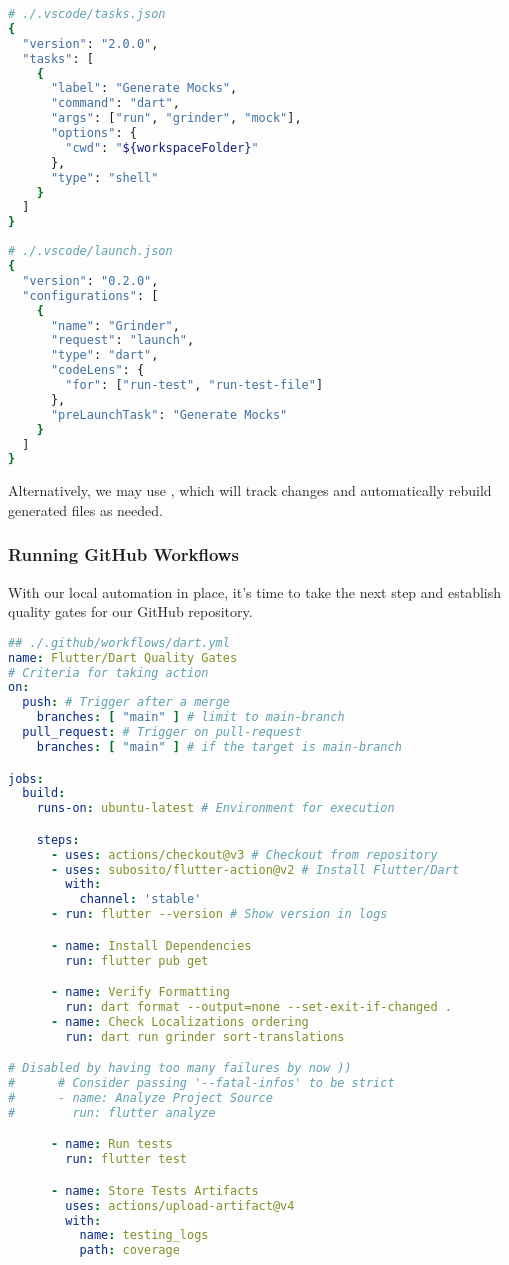 \begin{lstlisting}[language=bash]
# ./.vscode/tasks.json
{
  "version": "2.0.0",
  "tasks": [
    {
      "label": "Generate Mocks",
      "command": "dart",
      "args": ["run", "grinder", "mock"],
      "options": {
        "cwd": "${workspaceFolder}"
      },
      "type": "shell"
    }
  ]
}
\end{lstlisting}
\newpage
\begin{lstlisting}[language=bash]
# ./.vscode/launch.json
{
  "version": "0.2.0",
  "configurations": [
    {
      "name": "Grinder",
      "request": "launch",
      "type": "dart",
      "codeLens": {
        "for": ["run-test", "run-test-file"]
      },
      "preLaunchTask": "Generate Mocks"
    }
  ]
}
\end{lstlisting}

\noindent Alternatively, we may use , which will track changes and automatically 
rebuild generated files as needed.


\subsubsection{Running GitHub Workflows}

With our local automation in place, it's time to take the next step and establish quality gates for our GitHub repository.

\begin{lstlisting}[language=yaml]
## ./.github/workflows/dart.yml
name: Flutter/Dart Quality Gates
# Criteria for taking action
on:
  push: # Trigger after a merge
    branches: [ "main" ] # limit to main-branch
  pull_request: # Trigger on pull-request
    branches: [ "main" ] # if the target is main-branch

jobs:
  build:
    runs-on: ubuntu-latest # Environment for execution

    steps:
      - uses: actions/checkout@v3 # Checkout from repository
      - uses: subosito/flutter-action@v2 # Install Flutter/Dart
        with:
          channel: 'stable'
      - run: flutter --version # Show version in logs

      - name: Install Dependencies
        run: flutter pub get

      - name: Verify Formatting
        run: dart format --output=none --set-exit-if-changed .
      - name: Check Localizations ordering
        run: dart run grinder sort-translations

# Disabled by having too many failures by now ))
#      # Consider passing '--fatal-infos' to be strict
#      - name: Analyze Project Source
#        run: flutter analyze

      - name: Run tests
        run: flutter test

      - name: Store Tests Artifacts
        uses: actions/upload-artifact@v4
        with:
          name: testing_logs
          path: coverage
\end{lstlisting}

